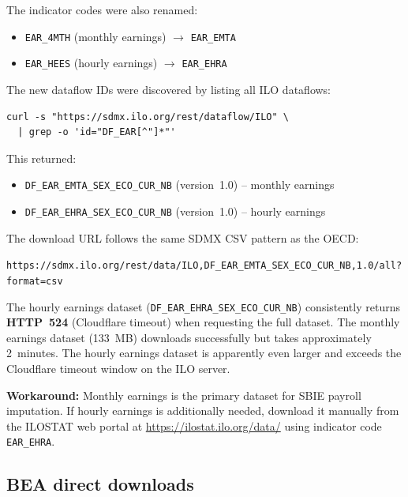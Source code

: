 \documentclass[12pt,a4paper]{article}
\begin{document}
The indicator codes were also renamed:
\begin{itemize}
    \item \texttt{EAR\_4MTH} (monthly earnings) $\rightarrow$ \texttt{EAR\_EMTA}
    \item \texttt{EAR\_HEES} (hourly earnings) $\rightarrow$ \texttt{EAR\_EHRA}
\end{itemize}

The new dataflow IDs were discovered by listing all ILO dataflows:
\begin{lstlisting}[style=shellstyle,caption={Discovering ILO dataflow IDs}]
curl -s "https://sdmx.ilo.org/rest/dataflow/ILO" \
  | grep -o 'id="DF_EAR[^"]*"'
\end{lstlisting}

This returned:
\begin{itemize}
    \item \texttt{DF\_EAR\_EMTA\_SEX\_ECO\_CUR\_NB} (version~1.0) -- monthly earnings
    \item \texttt{DF\_EAR\_EHRA\_SEX\_ECO\_CUR\_NB} (version~1.0) -- hourly earnings
\end{itemize}

The download URL follows the same SDMX CSV pattern as the OECD:
\begin{center}
\small\texttt{https://sdmx.ilo.org/rest/data/ILO,DF\_EAR\_EMTA\_SEX\_ECO\_CUR\_NB,1.0/all?format=csv}
\end{center}

\begin{warningbox}
The hourly earnings dataset (\texttt{DF\_EAR\_EHRA\_SEX\_ECO\_CUR\_NB}) consistently returns \textbf{HTTP~524} (Cloudflare timeout) when requesting the full dataset.
The monthly earnings dataset (133~MB) downloads successfully but takes approximately 2~minutes.
The hourly earnings dataset is apparently even larger and exceeds the Cloudflare timeout window on the ILO server.

\textbf{Workaround:} Monthly earnings is the primary dataset for SBIE payroll imputation.
If hourly earnings is additionally needed, download it manually from the ILOSTAT web portal at \url{https://ilostat.ilo.org/data/} using indicator code \texttt{EAR\_EHRA}.
\end{warningbox}


\subsection{BEA direct downloads}\label{sec:bea_discovery}
\end{document}
